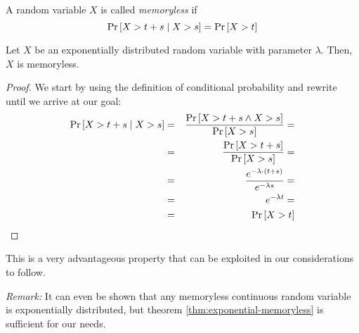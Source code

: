 \begin{definition}[Memorylessness]
  A random variable $X$ is called \emph{memoryless} if
  \begin{equation*}
    \operatorname{Pr}\left[X>t+s \mid X>s\right] = \operatorname{Pr}\left[X > t\right]
  \end{equation*}
\end{definition}

\begin{theorem}
  \label{thm:exponential-memoryless}
  Let $X$ be an exponentially distributed random variable with parameter $\lambda$. Then, $X$ is memoryless.
\end{theorem}

\begin{proof}
  We start by using the definition of conditional probability and rewrite until we arrive at our goal:
  \begin{eqnarray*}
    \operatorname{Pr}\left[X>t+s \mid X>s\right] &=& \frac{\operatorname{Pr}\left[X>t+s \wedge X>s\right]}{\operatorname{Pr}\left[X>s\right]} = \\
    &=& \frac{\operatorname{Pr}\left[X>t+s\right]}{\operatorname{Pr}\left[X>s\right]} = \\
    &=& \frac{e^{-\lambda \cdot(t+s)}}{e^{-\lambda s}} = \\
    &=& e^{-\lambda t} = \\
    &=& \operatorname{Pr}\left[X>t\right]
  \end{eqnarray*}
\end{proof}

This is a very advantageous property that can be exploited in our considerations to follow.

\emph{Remark:} It can even be shown that any memoryless continuous random variable is exponentially distributed, but theorem \ref{thm:exponential-memoryless} is sufficient for our needs.




